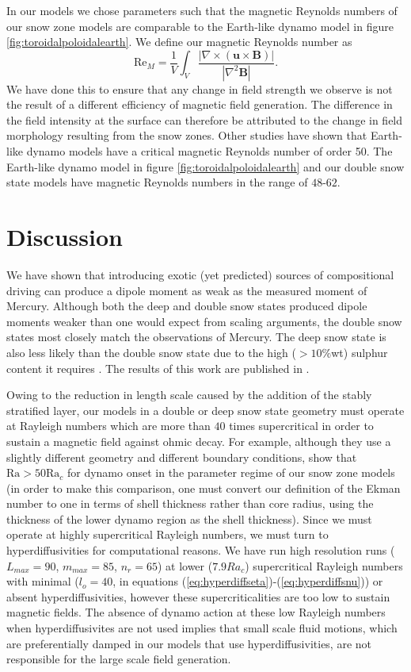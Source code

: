 In our models we chose parameters such that the magnetic Reynolds numbers of our snow zone models are comparable to the Earth-like dynamo model in figure \ref{fig:toroidalpoloidalearth}. We define our magnetic Reynolds number as
\begin{equation}
\mathrm{Re}_{M}=\frac{1}{V}\int_{V}\frac{\left|\nabla\times\left(\mathbf{u}\times\mathbf{B}\right)\right|}{\left|\nabla^{2}\mathbf{B}\right|}.
\end{equation}
We have done this to ensure that any change in field strength we observe is not the result of a different efficiency of magnetic field generation. The difference in the field intensity at the surface can therefore be attributed to the change in field morphology resulting from the snow zones. Other studies  \citep{christensen06scaling} have shown that Earth-like dynamo models have a critical magnetic Reynolds number of order 50. The Earth-like dynamo model in figure \ref{fig:toroidalpoloidalearth} and our double snow state models have magnetic Reynolds numbers in the range of $48$-$62$.

\section{Discussion}
We have shown that introducing exotic (yet predicted) sources of compositional driving can produce a dipole moment as weak as the measured moment of Mercury. Although both the deep and double snow states produced dipole moments weaker than one would expect from scaling arguments, the double snow states most closely match the observations of Mercury. The deep snow state is also less likely than the double snow state due to the high ($>10\%$wt) sulphur content it requires \citep{rivoldini09}. The results of this work are published in \citet{vilim2010}.

Owing to the reduction in length scale caused by the addition of the stably stratified layer, our models in a double or deep snow state geometry must operate at Rayleigh numbers which are more than $40$ times supercritical in order to sustain a magnetic field against ohmic decay. For example, although they use a slightly different geometry and different boundary conditions, \citet{christensen06} show that $\mathrm{Ra}>50\mathrm{Ra}_{c}$ for dynamo onset in the parameter regime of our snow zone models (in order to make this comparison, one must convert our definition of the Ekman number to one in terms of shell thickness rather than core radius, using the thickness of the lower dynamo region as the shell thickness). Since we must operate at highly supercritical Rayleigh numbers, we must turn to hyperdiffusivities for computational reasons. We have run high resolution runs  ($L_{max}=90$, $m_{max}=85$, $n_{r}=65$) at lower ($7.9 Ra_{c}$) supercritical Rayleigh numbers with minimal ($l_{o}=40$, in equations (\ref{eq:hyperdiffseta})-(\ref{eq:hyperdiffsnu})) or absent hyperdiffusivities, however these supercriticalities are too low to sustain magnetic fields. The absence of dynamo action at these low Rayleigh numbers when hyperdiffusivites are not used implies that small scale fluid motions, which are preferentially damped in our models that use hyperdiffusivities, are not responsible for the large scale field generation.

